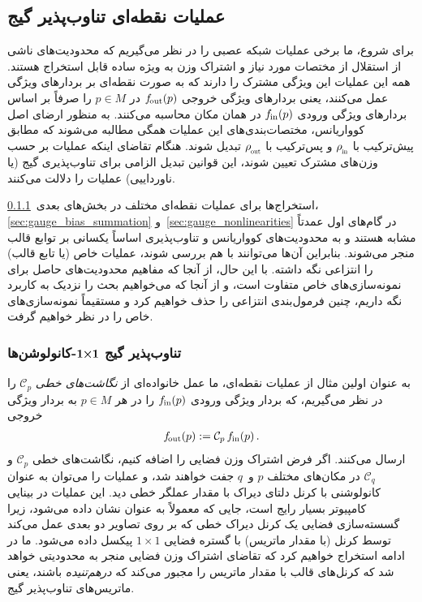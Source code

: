 

\subsection{عملیات نقطه‌ای تناوب‌پذیر گیج}
\label{sec:pointwise_operations}


برای شروع، ما برخی عملیات شبکه عصبی را در نظر می‌گیریم که محدودیت‌های ناشی از استقلال از مختصات مورد نیاز و اشتراک وزن به ویژه ساده قابل استخراج هستند.
همه این عملیات این ویژگی مشترک را دارند که به صورت نقطه‌ای بر بردارهای ویژگی عمل می‌کنند، یعنی بردارهای ویژگی خروجی $f_\textup{\:\!\!out}(p)$ در $p\in M$ را صرفاً بر اساس بردارهای ویژگی ورودی $f_\textup{\;\!\!in}(p)$ در همان مکان محاسبه می‌کنند.
به منظور ارضای اصل کوواریانس، مختصات‌بندی‌های این عملیات همگی مطالبه می‌شوند که مطابق پیش‌ترکیب با $\rhoin$ و پس‌ترکیب با $\rhoout$ تبدیل شوند.
هنگام تقاضای اینکه عملیات بر حسب وزن‌های مشترک تعیین شوند، این قوانین تبدیل الزامی برای تناوب‌پذیری گیج (یا ناورداییی) عملیات را دلالت می‌کنند.


استخراج‌ها برای عملیات نقطه‌ای مختلف در بخش‌های بعدی~\ref{sec:gauge_1x1}، \ref{sec:gauge_bias_summation} و~\ref{sec:gauge_nonlinearities} در گام‌های اول عمدتاً مشابه هستند و به محدودیت‌های کوواریانس و تناوب‌پذیری اساساً یکسانی بر توابع قالب منجر می‌شوند.
بنابراین آن‌ها می‌توانند با هم بررسی شوند، عملیات خاص (یا تابع قالب) را انتزاعی نگه داشته.
با این حال، از آنجا که مفاهیم محدودیت‌های حاصل برای نمونه‌سازی‌های خاص متفاوت است، و از آنجا که می‌خواهیم بحث را نزدیک به کاربرد نگه داریم، چنین فرمول‌بندی انتزاعی را حذف خواهیم کرد و مستقیماً نمونه‌سازی‌های خاص را در نظر خواهیم گرفت.













\subsubsection[تناوب‌پذیر گیج \texorpdfstring{\onexones}{1x1-convolutions}]%
{تناوب‌پذیر گیج ${\bf1\mkern-5.mu\boldsymbol{\times}\mkern-5.mu1}$-کانولوشن‌ها}
\label{sec:gauge_1x1}


به عنوان اولین مثال از عملیات نقطه‌ای، ما عمل خانواده‌ای از \emph{نگاشت‌های خطی} $\mathcal{C}_p$ را در نظر می‌گیریم، که بردار ویژگی ورودی $f_\textup{\;\!\!in}(p)$ را در هر $p\in M$ به بردار ویژگی خروجی
\begin{align}
	f_\textup{\:\!\!out}(p) := \mathcal{C}_p\, f_\textup{\;\!\!in}(p) \,.
\end{align}
ارسال می‌کنند.
اگر فرض اشتراک وزن فضایی را اضافه کنیم، نگاشت‌های خطی $\mathcal{C}_p$ و $\mathcal{C}_q$ در مکان‌های مختلف $p$ و~$q$ جفت خواهند شد، و عملیات را می‌توان به عنوان کانولوشنی با کرنل دلتای دیراک با مقدار عملگر خطی دید.
این عملیات در بینایی کامپیوتر بسیار رایج است، جایی که معمولاً به عنوان \onexoneit نشان داده می‌شود، زیرا گسسته‌سازی فضایی یک کرنل دیراک خطی که بر روی تصاویر دو بعدی عمل می‌کند توسط کرنل (با مقدار ماتریس) با گستره فضایی $1\!\times\!1$ پیکسل داده می‌شود.
ما در ادامه استخراج خواهیم کرد که تقاضای اشتراک وزن فضایی منجر به محدودیتی خواهد شد که کرنل‌های قالب با مقدار ماتریس را مجبور می‌کند که \emph{درهم‌تنیده} باشند، یعنی ماتریس‌های تناوب‌پذیر گیج.


